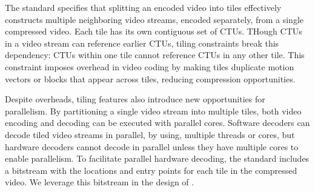 The \hevc standard specifies that splitting an encoded video into tiles effectively constructs multiple neighboring video streams, encoded separately, from a single compressed video.
Each tile has its own contiguous set of CTUs.
THough CTUs in a video stream can reference earlier CTUs, tiling constraints break this dependency: CTUs within one tile cannot reference CTUs in any other tile.
This constraint imposes overhead in video coding by making tiles duplicate motion vectors or blocks that appear across tiles, reducing compression opportunities.

Despite overheads, tiling features also introduce new opportunities for parallelism.
By partitioning a single video stream into multiple tiles, both video encoding and decoding can be executed with parallel cores.
Software decoders can decode tiled video streams in parallel, by using, multiple threads or cores, but hardware decoders cannot decode in parallel unless they have multiple cores to enable parallelism.
To facilitate parallel hardware decoding, the \hevc standard includes a bitstream with the locations and entry points for each tile in the compressed video.
We leverage this bitstream in the design of \nameArch.

